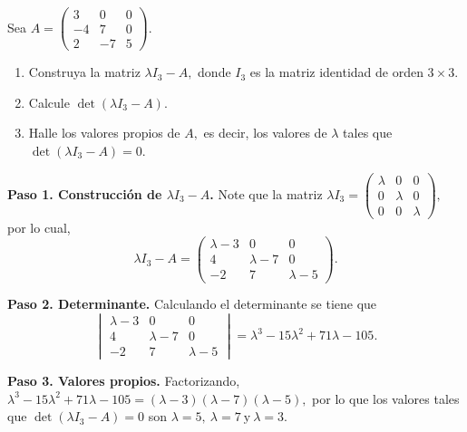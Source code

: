 \begin{prob} Sea $A=\left(
\begin{matrix}
3&0&0\\
-4&7&0\\
2&-7&5
\end{matrix} 
\right).$
\begin{enumerate}[$(a)$]
\item Construya la matriz $\lambda I_{3} - A,$ donde $I_{3}$ es la matriz identidad de orden $3\times 3$.

\item Calcule $\det(\lambda I_{3}-A).$

\item Halle los valores propios de $A,$ es decir, los valores de $\lambda$ tales que $\det(\lambda I_{3}-A)=0.$  
\end{enumerate}

\begin{myproof}
\textbf{Paso 1. Construcción de $\lambda I_3 - A$.} Note que la matriz $\lambda I_{3}=\begin{pmatrix} \lambda &0&0\\0&\lambda &0\\ 0&0&\lambda \end{pmatrix},$ por lo cual,
$$\lambda I_{3}-A=\begin{pmatrix} \lambda-3&0&0\\4&\lambda -7&0\\-2&7&\lambda-5 \end{pmatrix}.$$

\textbf{Paso 2. Determinante.} Calculando el determinante se tiene que
\[ \begin{vmatrix}
\lambda-3 & 0 & 0 \\
4 & \lambda-7 & 0 \\
-2 & 7 & \lambda-5
\end{vmatrix}=\lambda^3-15\lambda^2+71\lambda-105. \]

\textbf{Paso 3. Valores propios.} Factorizando, $\lambda^3-15\lambda^2+71\lambda-105=\left(\lambda -3\right)\left( \lambda -7 \right)\left( \lambda -5 \right),$ por lo que los valores tales que $\det(\lambda I_{3}-A)=0$ son $\boxed{\lambda=5,\ \lambda=7\ \text{y}\ \lambda=3}.$

\end{myproof}
\end{prob}


